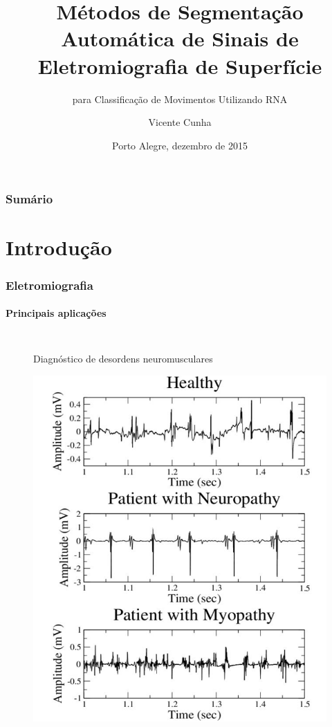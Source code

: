 \documentclass{beamer}
\title[Métodos de Segmentação Automática de Sinais de sEMG] %
{Métodos de Segmentação Automática de Sinais de Eletromiografia de Superfície}
\subtitle{para Classificação de Movimentos Utilizando RNA}
\author[Cunha] %
{Vicente Cunha}
\institute[UFRGS] %
{
  Universidade Federal do Rio Grande do Sul
}
\date[dezembro de 2015] %
{Porto Alegre, dezembro de 2015}
\begin{document}
	
	\frame{\titlepage}
	
	\begin{frame}
		\frametitle{Sumário}
		\tableofcontents[currentsection]
	\end{frame}
	
	\section[Introdução]{Introdução}
	
	\begin{frame}
		\frametitle{Eletromiografia}
		\framesubtitle{Principais aplicações}
		\begin{columns}[c]
			\column{.5\textwidth}
				\begin{figure}
					Diagnóstico de desordens neuromusculares
					\begin{center}
						\includegraphics[width=\textwidth]{./img/disorders.png}
					\end{center}
				\end{figure}
				

\end{columns}
\end{frame}
\end{document}
